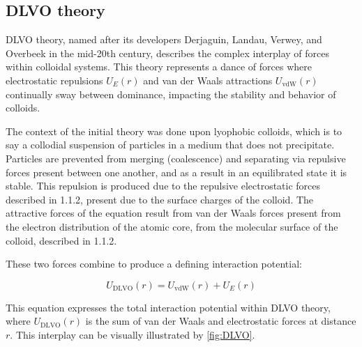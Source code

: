 \subsection{DLVO theory}



DLVO theory, named after its developers Derjaguin, Landau, Verwey, and Overbeek in the mid-20th century, describes the complex interplay of forces within colloidal systems. This theory represents a dance of forces where electrostatic repulsions \( U_E(r) \) and van der Waals attractions \( U_{\text{vdW}}(r) \) continually sway between dominance, impacting the stability and behavior of colloids.\cite{DLVOorign} \cite{Origin2V} \cite{DERJAGUINORIGIN}


The context of the initial theory was done upon lyophobic colloids, which is to say a collodial suspension of particles in a medium that does not precipitate. Particles are prevented from merging (coalescence) and separating via repulsive forces present between one another, and as a result in an equilibrated state it is stable. This repulsion is produced due to the repulsive electrostatic forces described in 1.1.2, present due to the surface charges of the colloid. The attractive forces of the equation result from van der Waals forces present from the electron distribution of the atomic core, from the molecular surface of the colloid, described in 1.1.2.\cite{DLVOthesis}

These two forces combine to produce a defining interaction potential:

\begin{equation}
U_{\text{DLVO}}(r) = U_{\text{vdW}}(r) + U_{E}(r)
\end{equation}

This equation expresses the total interaction potential within DLVO theory, where \( U_{\text{DLVO}}(r) \) is the sum of van der Waals and electrostatic forces at distance \( r \). This interplay can be visually illustrated by \ref{fig:DLVO}.


